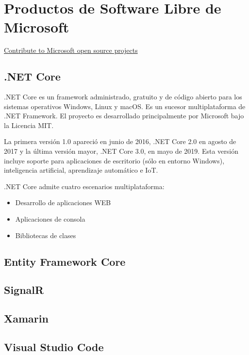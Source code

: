 \section{Productos de Software Libre de Microsoft}
\href{https://opensource.microsoft.com/explore}{Contribute to Microsoft open source projects}
\subsection{.NET Core}
.NET Core es un framework administrado, gratuito y de código abierto para los sistemas operativos Windows, Linux y macOS. Es un sucesor multiplataforma de .NET Framework. El proyecto es desarrollado principalmente por Microsoft bajo la Licencia MIT.

La primera versión 1.0 apareció en junio de 2016, .NET Core 2.0 en agosto de 2017 y la última versión mayor, .NET Core 3.0, en mayo de 2019. Esta versión incluye soporte para aplicaciones de escritorio (sólo en entorno Windows), inteligencia artificial, aprendizaje automático e IoT.

.NET Core admite cuatro escenarios multiplataforma:
\begin{itemize}
    \item {Desarrollo de aplicaciones WEB}
    \item {Aplicaciones de consola}
    \item {Bibliotecas de clases}
\end{itemize}

\subsection{Entity Framework Core}
\subsection{SignalR}
\subsection{Xamarin}
\subsection{Visual Studio Code}